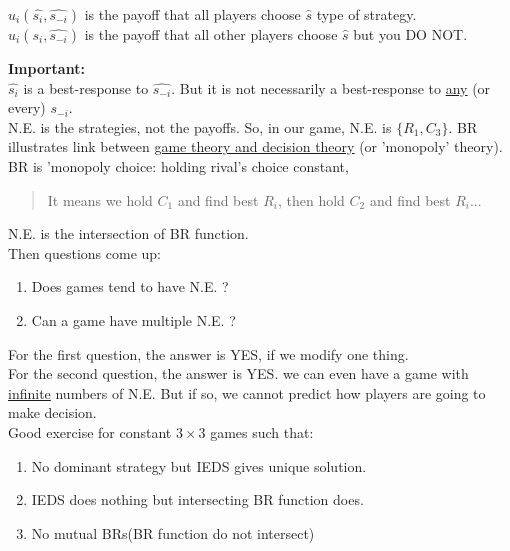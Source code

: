 \documentclass[12pt]{article}
\newcommand{\bb}[1]{{\textbf {#1}}}
\newcommand{\uu}[1]{\underline{#1}}
\newcommand{\e}[1]{$ #1 $}
\begin{document}
\begin{spacing}{1.5}
            \e{u_i(\hat{s_i}, \hat{s_{-i}})} is the payoff that all players choose \e{\hat{s}} type
            of strategy.\\
            \e{u_i(s_i, \hat{s_{-i}})} is the payoff that all other players choose \e{\hat{s}} 
            but you DO NOT.

            \bb{Important:}\\
            \e{\hat{s_i}} is a best-response to \e{\hat{s_{-i}}}. But it is not necessarily a 
            best-response to \uu{any} (or every) \e{s_{-i}}. \\

            N.E. is the strategies, not the payoffs. So, in our game, N.E. is
            \e{ \{R_1, C_3 \}}. BR illustrates link between \uu{game theory and decision theory}
            (or 'monopoly' theory). BR is 'monopoly choice: holding rival's choice constant,
            \begin{quotation}
                It means we hold \e{C_1} and find best \e{R_i}, then hold \e{C_2} and find best \e{R_i}...
            \end{quotation}

            N.E. is the intersection of BR function.\\

            Then questions come up:
            \begin{enumerate}
                \item Does games tend to have N.E. ?
                \item Can a game have multiple N.E. ?
            \end{enumerate}

            For the first question, the answer is YES, if we modify one thing.\\
            For the second question, the answer is YES. we can even have a game with \uu{infinite}
            numbers of N.E. But if so, we cannot predict how players are going to make decision.\\

            Good exercise for constant \e{3 \times 3} games such that:
            \begin{enumerate}
                \item No dominant strategy but IEDS gives unique solution.
                \item IEDS does nothing but intersecting BR function does.
                \item No mutual BRs(BR function do not intersect)
            \end{enumerate}


\end{spacing}
\end{document}
